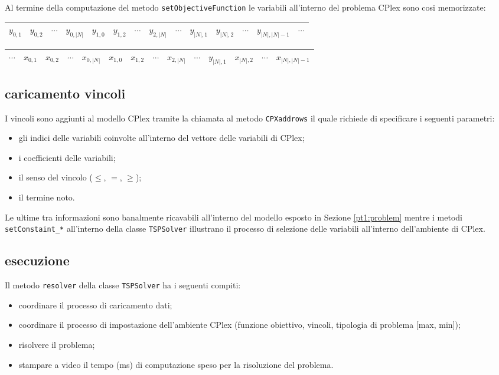 Al termine della computazione del metodo \texttt{setObjectiveFunction} le variabili all'interno del problema CPlex sono cosi memorizzate:

\begin{tabular}{|c|c|c|c|c|c|c|c|c|c|c|c|c|c}
\hline 
$y_{0,1}$ & $y_{0,2}$ & $\cdots$ & $y_{0,\left|N\right|}$ & $y_{1,0}$ & $y_{1,2}$ & $ \cdots $ & $y_{2,\left|N\right|}$ & $\cdots$ & $y_{\left|N\right|,1}$ & $y_{\left|N\right|,2}$ & $\cdots$ & $y_{\left|N\right|,\left|N\right| - 1}$ & $\cdots$\\ 
\hline 
\end{tabular}

\begin{tabular}{c|c|c|c|c|c|c|c|c|c|c|c|c|c|}
\hline 
$\cdots$ & $x_{0,1}$ & $x_{0,2}$ & $\cdots$ & $x_{0,\left|N\right|}$ & $x_{1,0}$ & $x_{1,2}$ & $ \cdots $ & $x_{2,\left|N\right|}$ & $\cdots$ & $y_{\left|N\right|,1}$ & $x_{\left|N\right|,2}$ & $\cdots$ & $x_{\left|N\right|,\left|N\right| - 1}$\\ 
\hline 
\end{tabular}  

\subsection[Caricamento vincoli]{caricamento vincoli}
\label{pt1:solver:constraint}
I vincoli sono aggiunti al modello CPlex tramite la chiamata al metodo \texttt{CPXaddrows} il quale richiede di specificare i seguenti parametri:

\begin{itemize}
\item gli indici delle variabili coinvolte all'interno del vettore delle variabili di CPlex;
\item i coefficienti delle variabili;
\item il senso del vincolo ($\le$, $=$, $\ge$);
\item il termine noto.
\end{itemize}

Le ultime tra informazioni sono banalmente ricavabili all'interno del modello esposto in Sezione \ref{pt1:problem} mentre i metodi \texttt{setConstaint\_*} all'interno della classe \texttt{TSPSolver} illustrano il processo di selezione delle variabili all'interno dell'ambiente di CPlex.

\subsection[Esecuzione]{esecuzione}
\label{pt1:solver:esecution}
Il metodo \texttt{resolver} della classe \texttt{TSPSolver} ha i seguenti compiti:

\begin{itemize}
\item coordinare il processo di caricamento dati;
\item coordinare il processo di impostazione dell'ambiente CPlex (funzione obiettivo, vincoli, tipologia di problema [max, min]);
\item risolvere il problema;
\item stampare a video il tempo (ms) di computazione speso per la risoluzione del problema.
\end{itemize}